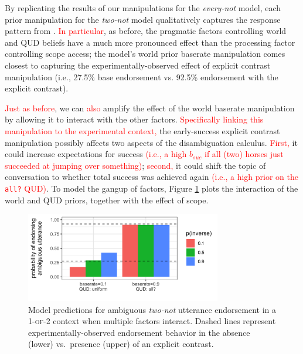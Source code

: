 \documentclass[preprint,authoryear]{elsarticle}\frenchspacing
\newcommand{\lp}[1]{\textcolor{red}{#1}} %
\begin{document}
By replicating the results of our manipulations for the \emph{every-not} model, each prior manipulation for the \emph{two-not} model qualitatively captures the response pattern from \cite{musolinolidz2003}. 
\lp{In particular}, as before, the pragmatic factors controlling world and QUD beliefs have a much more pronounced effect than the processing factor controlling scope access; 
the model's world prior baserate manipulation comes closest to capturing the experimentally-observed effect of explicit contrast manipulation (i.e., 27.5\% base endorsement vs. 92.5\% endorsement with the explicit contrast). 

\lp{Just as before}, we can \lp{also} amplify the effect of the world baserate manipulation by allowing it to interact with the other factors. 
\lp{Specifically linking this manipulation to the experimental context,}
the early-success explicit contrast manipulation possibly affects two aspects of the disambiguation calculus.
\lp{First,} it could increase expectations for success 
\lp{(i.e., a high $b_{suc}$ if all (two) horses just succeeded at jumping over something)};
\lp{second,} it could shift the topic of conversation to whether total success was achieved again
\lp{(i.e., a high prior on the \texttt{all?} QUD)}. 
To model the gangup of factors, Figure \ref{fig:interactions} plots the interaction of the world and QUD priors, together with the effect of scope.

\begin{figure}[!ht]
\centering
\includegraphics[height=1.55in]{two-not-pragmatic.png}
\vspace{-20pt}
\caption{Model predictions for ambiguous \textit{two-not} utterance endorsement in a \textsc{1-of-2} context when multiple factors interact. Dashed lines represent experimentally-observed endorsement behavior in the absence (lower) vs.~presence (upper) of an explicit contrast.}
\label{fig:interactions}
\vspace{-10pt}
\end{figure}
\end{document}
